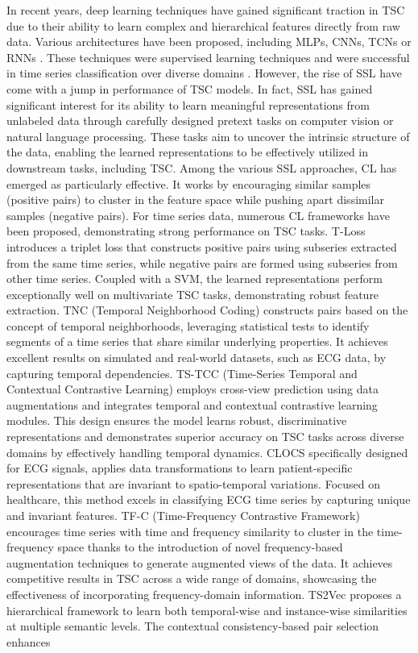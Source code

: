 In recent years, deep learning techniques have gained significant traction in TSC due to their ability to learn complex and hierarchical features directly from raw data. Various architectures have been proposed, including MLPs, CNNs, TCNs or RNNs \cite{zheng2016exploiting, wang2017time, zhao2017convolutional}. These techniques were supervised learning techniques and were successful in time series classification over diverse domains \cite{ismail2019deep}. However, the rise of SSL have come with a jump in performance of TSC models. In fact, SSL has gained significant interest for its ability to learn meaningful representations from unlabeled data through carefully designed pretext tasks on computer vision or natural language processing. These tasks aim to uncover the intrinsic structure of the data, enabling the learned representations to be effectively utilized in downstream tasks, including TSC. Among the various SSL approaches, CL has emerged as particularly effective. It works by encouraging similar samples (positive pairs) to cluster in the feature space while pushing apart dissimilar samples (negative pairs). For time series data, numerous CL frameworks have been proposed, demonstrating strong performance on TSC tasks. T-Loss \cite{franceschi2019unsupervised} introduces a triplet loss that constructs positive pairs using subseries extracted from the same time series, while negative pairs are formed using subseries from other time series. Coupled with a SVM, the learned representations perform exceptionally well on multivariate TSC tasks, demonstrating robust feature extraction. TNC (Temporal Neighborhood Coding) \cite{tonekaboni2021unsupervised} constructs pairs based on the concept of temporal neighborhoods, leveraging statistical tests to identify segments of a time series that share similar underlying properties. It achieves excellent results on simulated and real-world datasets, such as ECG data, by capturing temporal dependencies. TS-TCC (Time-Series Temporal and Contextual Contrastive Learning) \cite{Eldele2021TimeSeriesRL} employs cross-view prediction using data augmentations and integrates temporal and contextual contrastive learning modules. This design ensures the model learns robust, discriminative representations and demonstrates superior accuracy on TSC tasks across diverse domains by effectively handling temporal dynamics. CLOCS \cite{kiyasseh2021clocs} specifically designed for ECG signals, applies data transformations to learn patient-specific representations that are invariant to spatio-temporal variations. Focused on healthcare, this method excels in classifying ECG time series by capturing unique and invariant features. TF-C (Time-Frequency Contrastive Framework) \cite{zhang2022self} encourages time series with time and frequency similarity to cluster in the time-frequency space thanks to the introduction of novel frequency-based augmentation techniques to generate augmented views of the data. It achieves competitive results in TSC across a wide range of domains, showcasing the effectiveness of incorporating frequency-domain information. TS2Vec \cite{Yue2021TS2VecTU} proposes a hierarchical framework to learn both temporal-wise and instance-wise similarities at multiple semantic levels. The contextual consistency-based pair selection enhances 